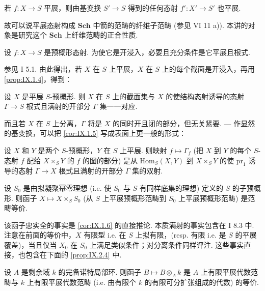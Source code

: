 \begin{proposition}\label{prop:IX.1.3}
若 $f \colon X \to S$ 平展，则由基变换 $S' \to S$ 得到的任何态射 $f' \colon X' \to S'$ 也平展.
\end{proposition}

故可以说平展态射构成 $\mathbf{Sch}$ 中箭的范畴的纤维子范畴 (参见 VI 11 a)). 本讲的对象是研究这个 $\mathbf{Sch}$ 上纤维范畴的正合性质.

\begin{proposition}\label{prop:IX.1.4}
设 $f \colon X \to S$ 是预概形态射. 为使它是开浸入，必要且充分条件是它平展且根式.
\end{proposition}

参见 I 5.1. 由此得出，若 $X$ 在 $S$ 上平展，$X$ 在 $S$ 上的每个截面是开浸入，再用 \ref{prop:IX.1.4}，得到：

\begin{corollary}\label{cor:IX.1.5}
设 $X$ 是平展 $S$-预概形. 则 $X$ 在 $S$ 上的截面集与 $X$ 的使结构态射诱导的态射 $\Gamma \to S$ 根式且满射的开部分 $\Gamma$ 集一一对应.
\end{corollary}

而且若 $X$ 在 $S$ 上分离，$\Gamma$ 将是 $X$ 的同时开且闭的部分，但无关紧要. — 作显然的基变换，可以把 \ref{cor:IX.1.5} 写成表面上更一般的形式：

\begin{corollary}\label{cor:IX.1.6}
设 $X$ 和 $Y$ 是两个 $S$-预概形，$Y$ 在 $S$ 上平展. 则映射 $f \mapsto \Gamma_f$ (把 $X$ 到 $Y$ 的每个 $S$-态射 $f$ 配给 $X \times_S Y$ 的 $f$ 的图的部分) 是从 $\mathrm{Hom}_S(X, Y)$ 到 $X \times_S Y$ 的使 $\mathrm{pr}_1$ 诱导的态射 $\Gamma \to X$ 根式且满射的开部分 $\Gamma$ 集的双射.
\end{corollary}

\begin{proposition}\label{prop:IX.1.7}
设 $S_0$ 是由拟凝聚幂零理想 (i.e. 使 $S_0$ 与 $S$ 有同样底集的理想) 定义的 $S$ 的子预概形. 则函子 $X \mapsto X \times_S S_0$ (从 $S$ 上平展预概形范畴到 $S_0$ 上平展预概形范畴) 是范畴等价.
\end{proposition}

该函子忠实全的事实是 \ref{cor:IX.1.6} 的直接推论. 本质满射的事实包含在 I 8.3 中. 注意在前面的等价中，$X$ 有限型 i.e. 在 $S$ 上拟有限，(resp. 有限 i.e. 是 $S$ 的平展覆盖)，当且仅当 $X_0$ 在 $S_0$ 上满足类似条件；对分离条件同样评注. 这些事实直接，也包含在下面的 \ref{prop:IX.2.4} 中.

\begin{corollary}\label{cor:IX.1.8}
设 $A$ 是剩余域 $k$ 的完备诺特局部环. 则函子 $B \mapsto B \otimes_A k$ 是 $A$ 上有限平展代数范畴与 $k$ 上有限平展代数范畴 (i.e. 由有限个 $k$ 的有限可分扩张组成的代数) 的等价.
\end{corollary}

